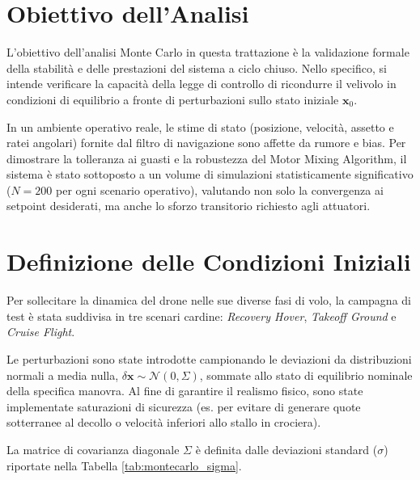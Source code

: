 \section{Obiettivo dell'Analisi}
L'obiettivo dell'analisi Monte Carlo in questa trattazione è la validazione formale della stabilità e delle prestazioni del sistema a ciclo chiuso. Nello specifico, si intende verificare la capacità della legge di controllo di ricondurre il velivolo in condizioni di equilibrio a fronte di perturbazioni sullo stato iniziale $\bm{x}_0$. 

In un ambiente operativo reale, le stime di stato (posizione, velocità, assetto e ratei angolari) fornite dal filtro di navigazione sono affette da rumore e bias. Per dimostrare la tolleranza ai guasti e la robustezza del Motor Mixing Algorithm, il sistema è stato sottoposto a un volume di simulazioni statisticamente significativo ($N = 200$ per ogni scenario operativo), 
valutando non solo la convergenza ai setpoint desiderati, ma anche lo sforzo transitorio richiesto agli attuatori.

\section{Definizione delle Condizioni Iniziali}
Per sollecitare la dinamica del drone nelle sue diverse fasi di volo, la campagna di test è stata suddivisa in tre scenari cardine: \textit{Recovery Hover}, \textit{Takeoff Ground} e \textit{Cruise Flight}. 

Le perturbazioni sono state introdotte campionando le deviazioni da distribuzioni normali a media nulla, $\delta \bm{x} \sim \mathcal{N}(0, \Sigma)$, sommate allo stato di equilibrio nominale della specifica manovra. Al fine di garantire il realismo fisico, sono state implementate saturazioni di sicurezza (es. per evitare di generare quote sotterranee al decollo o velocità inferiori allo stallo in crociera).

La matrice di covarianza diagonale $\Sigma$ è definita dalle deviazioni standard ($\sigma$) riportate nella Tabella \ref{tab:montecarlo_sigma}.

